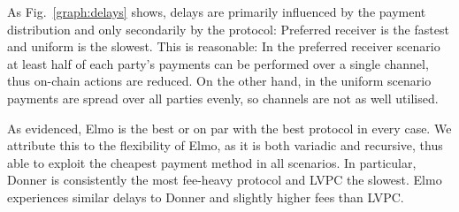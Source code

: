   As Fig.~\ref{graph:delays} shows, delays are primarily influenced by the
  payment distribution and only secondarily by the protocol: Preferred
  receiver is the fastest and uniform is the slowest. This is reasonable:
  In the preferred receiver scenario at least half of each party's payments can
  be performed over a single channel, thus on-chain actions are reduced. On the
  other hand, in the uniform scenario payments are spread over all parties
  evenly, so channels are not as well utilised.

  As evidenced, Elmo is the best or on par with the best protocol in every
  case. We attribute this to the flexibility of Elmo, as it is both variadic and
  recursive, thus able to exploit the cheapest payment method in all scenarios.
  In particular, Donner is consistently the most fee-heavy protocol and LVPC the
  slowest. Elmo experiences similar delays to Donner and slightly higher fees
  than LVPC.

